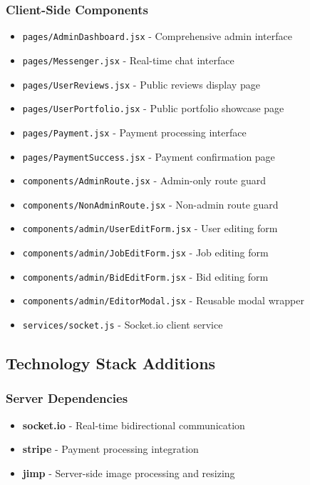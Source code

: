 \documentclass[11pt]{article}
\begin{document}
\subsubsection{Client-Side Components}
\begin{itemize}[leftmargin=1.4em]
  \item \texttt{pages/AdminDashboard.jsx} - Comprehensive admin interface
  \item \texttt{pages/Messenger.jsx} - Real-time chat interface
  \item \texttt{pages/UserReviews.jsx} - Public reviews display page
  \item \texttt{pages/UserPortfolio.jsx} - Public portfolio showcase page
  \item \texttt{pages/Payment.jsx} - Payment processing interface
  \item \texttt{pages/PaymentSuccess.jsx} - Payment confirmation page
  \item \texttt{components/AdminRoute.jsx} - Admin-only route guard
  \item \texttt{components/NonAdminRoute.jsx} - Non-admin route guard
  \item \texttt{components/admin/UserEditForm.jsx} - User editing form
  \item \texttt{components/admin/JobEditForm.jsx} - Job editing form
  \item \texttt{components/admin/BidEditForm.jsx} - Bid editing form
  \item \texttt{components/admin/EditorModal.jsx} - Reusable modal wrapper
  \item \texttt{services/socket.js} - Socket.io client service
\end{itemize}

\subsection{Technology Stack Additions}

\subsubsection{Server Dependencies}
\begin{itemize}[leftmargin=1.4em]
  \item \textbf{socket.io} - Real-time bidirectional communication
  \item \textbf{stripe} - Payment processing integration
  \item \textbf{jimp} - Server-side image processing and resizing
\end{itemize}
\end{document}
